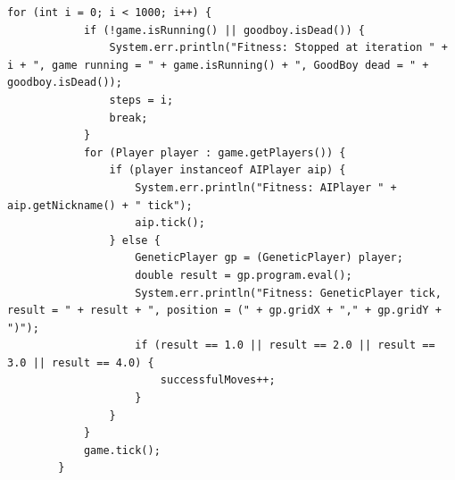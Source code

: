 \documentclass[sigconf]{acmart} %
\begin{document}
\begin{verbatim}
for (int i = 0; i < 1000; i++) {
            if (!game.isRunning() || goodboy.isDead()) {
                System.err.println("Fitness: Stopped at iteration " + i + ", game running = " + game.isRunning() + ", GoodBoy dead = " + goodboy.isDead());
                steps = i;
                break;
            }
            for (Player player : game.getPlayers()) {
                if (player instanceof AIPlayer aip) {
                    System.err.println("Fitness: AIPlayer " + aip.getNickname() + " tick");
                    aip.tick();
                } else {
                    GeneticPlayer gp = (GeneticPlayer) player;
                    double result = gp.program.eval();
                    System.err.println("Fitness: GeneticPlayer tick, result = " + result + ", position = (" + gp.gridX + "," + gp.gridY + ")");
                    if (result == 1.0 || result == 2.0 || result == 3.0 || result == 4.0) {
                        successfulMoves++;
                    }
                }
            }
            game.tick();
        }
\end{verbatim}
\end{document}
